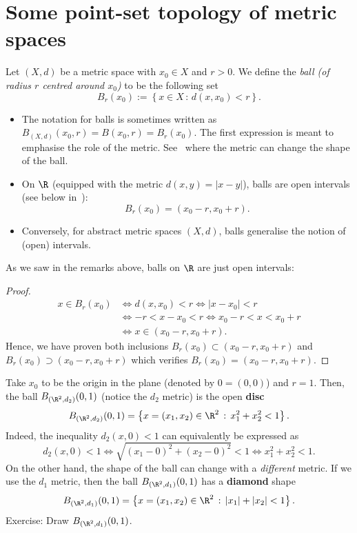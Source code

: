 \section{Some point-set topology of metric spaces}
\label{sec:1_2}
\begin{defn}[Balls]
\label{defn:ball}
Let $(X,d)$ be a metric space with $x_0\in X$ and $r>0$. We define the \textit{ball (of radius $r$ centred around $x_0$)} to be the following set
\[
B_r(x_0):= \left\{
x\in X \, : \, d(x,x_0)<r
\right\}.
\]
\end{defn}
\begin{rem}
	\begin{itemize}
		\item The notation for balls is sometimes written as $B_{(X,d)}(x_0,r) =B(x_0,r) = B_r(x_0)$. The first expression is meant to emphasise the role of the metric. See~ where the metric can change the shape of the ball.
		\item On $\R$ (equipped with the metric $d(x,y) = |x-y|$), balls are open intervals (see below in~):
		\[
		B_r(x_0) = (x_0-r,x_0+r).
		\]
		\item Conversely, for abstract metric spaces $(X,d)$, balls generalise the notion of (open) intervals.
	\end{itemize}
\end{rem}
\begin{eg}[Balls on $\R$]
	\label{eg:ball_R}
	As we saw in the remarks above, balls on $\R$ are just open intervals:
	\begin{proof}
	\begin{align*}
		x \in B_r(x_0) 	&\iff d(x,x_0)< r \iff |x-x_0| < r 	\\
		&\iff -r < x-x_0 < r \iff x_0-r<x<x_0+r 	\\
		&\iff x\in (x_0-r,x_0+r).
	\end{align*}
	Hence, we have proven both inclusions $B_r(x_0) \subset (x_0-r,x_0+r)$ and $B_r(x_0) \supset (x_0-r,x_0+r)$ which verifies $B_r(x_0) = (x_0-r,x_0+r)$.
	\end{proof}
\end{eg}
\begin{eg}[Balls on $\R^2$]
	\label{eg:ball_metric}
	Take $x_0$ to be the origin in the plane (denoted by $0 = (0,0)$) and $r=1$. Then, the ball $B_{(\R^2,d_2)}(0,1)$ (notice the $d_2$ metric) is the open \textbf{disc}
	\[
	B_{(\R^2,d_2)}(0,1) = \left\{
	x = (x_1,x_2) \in \R^2 \, : \, x_1^2 + x_2^2 < 1 
	\right\}.
	\]
	Indeed, the inequality $d_2(x,0) < 1$ can equivalently be expressed as
	\[
	d_2(x,0) < 1 \iff \sqrt{(x_1-0)^2 + (x_2-0)^2}< 1 \iff x_1^2 + x_2^2 < 1.
	\]
	On the other hand, the shape of the ball can change with a \textit{different} metric. If we use the $d_1$ metric, then the ball $B_{(\R^2,d_1)}(0,1)$ has a \textbf{diamond} shape
	\[
	B_{(\R^2,d_1)}(0,1) = \left\{
	x = (x_1,x_2)\in \R^2 \, : \, |x_1| + |x_2| < 1
	\right\}.
	\]
	Exercise: Draw $B_{(\R^2,d_1)}(0,1)$.
\end{eg}
